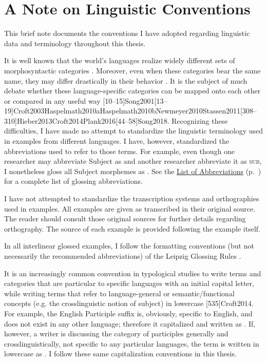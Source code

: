 \chapter*{A Note on Linguistic Conventions}
\label{ch:conventions}

This brief note documents the conventions I have adopted regarding linguistic data and terminology throughout this thesis.


It is well known that the world's languages realize widely different sets of morphosyntactic categories . Moreover, even when these categories bear the same name, they may differ drastically in their behavior \citep[9]{Dixon2010}. It is the subject of much debate whether these language-specific categories can be mapped onto each other or compared in any useful way [10--15]{Song2001}[13--19]{Croft2003}{Haspelmath2010a}{Haspelmath2010b}{Newmeyer2010}{Stassen2011}[308--310]{Hieber2013}{Croft2014}{Plank2016}[44--58]{Song2018}. Recognizing these difficulties, I have made no attempt to standardize the linguistic terminology used in examples from different languages. I have, however, standardized the abbreviations used to refer to those terms. For example, even though one researcher may abbreviate Subject as  and another researcher abbreviate it as \textsc{sub}, I nonetheless gloss all Subject morphemes as . See the \hyperref[ch:abbreviations]{List of Abbreviations} (p.~\pageref{ch:abbreviations}) for a complete list of glossing abbreviations.

I have not attempted to standardize the transcription systems and orthographies used in examples. All examples are given as transcribed in their original source. The reader should consult those original sources for further details regarding orthography. The source of each example is provided following the example itself.

In all interlinear glossed examples, I follow the formatting conventions (but not necessarily the recommended abbreviations) of the Leipzig Glossing Rules \citep{BickelComrieHaspelmath2015}.


It is an increasingly common convention in typological studies to write terms and categories that are particular to specific languages with an initial capital letter, while writing terms that refer to language-general or semantic/functional concepts (e.g. the crosslinguistic notion of subject) in lowercase [535]{Croft2014}. For example, the English Participle suffix  is, obviously, specific to English, and does not exist in any other language; therefore it capitalized and written as . If, however, a writer is discussing the category of participles generally and crosslinguistically, not specific to any particular languages, the term is written in lowercase as . I follow these same capitalization conventions in this thesis.

